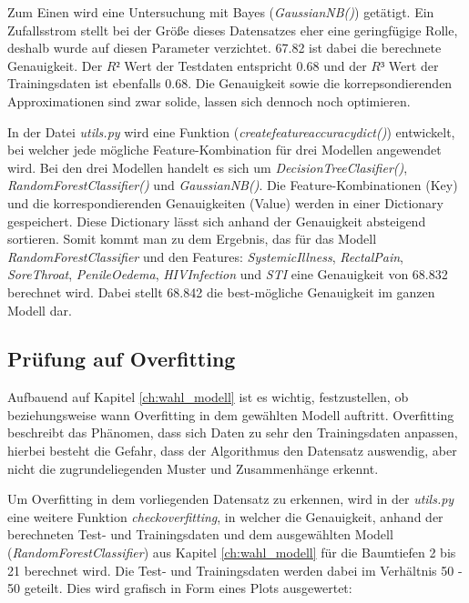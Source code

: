 \documentclass[13pt,a4paper, listof=entryprefix, bibliography=totocnumbered,toc=listofnumbered,lof=listofnumbered]{scrartcl}
\begin{document}
Zum Einen wird eine Untersuchung mit Bayes (\textit{GaussianNB()}) getätigt. Ein Zufallsstrom stellt bei der Größe dieses Datensatzes eher eine geringfügige
Rolle, deshalb wurde auf diesen Parameter verzichtet. 67.82 ist dabei die berechnete Genauigkeit. Der $R²$ Wert der Testdaten entspricht 0.68 und der $R³$ Wert der
Trainingsdaten ist ebenfalls 0.68.  Die Genauigkeit sowie die korrepsondierenden Approximationen sind zwar solide, lassen sich dennoch noch optimieren. 

In der Datei \textit{utils.py} wird eine Funktion (\textit{create\textunderscore feature\textunderscore accuracy\textunderscore dict()}) entwickelt, bei welcher jede mögliche Feature-Kombination für drei Modellen angewendet wird. Bei den drei Modellen handelt es sich um 
\textit{DecisionTreeClasifier()}, \textit{RandomForestClassifier()} und \textit{GaussianNB()}. Die Feature-Kombinationen (Key) und die korrespondierenden Genauigkeiten (Value) werden in 
einer Dictionary gespeichert. Diese Dictionary lässt sich anhand der Genauigkeit absteigend sortieren. Somit kommt man zu dem Ergebnis, das für das Modell \textit{RandomForestClassifier} und 
den Features: \textit{Systemic\textunderscore  Illness}, \textit{Rectal\textunderscore Pain}, \textit{Sore\textunderscore Throat}, \textit{Penile\textunderscore Oedema}, \textit{HIV\textunderscore Infection} und \textit{STI} 
eine Genauigkeit von 68.832 berechnet wird. Dabei stellt 68.842 die best-mögliche Genauigkeit im ganzen Modell dar. 

	\subsection{Prüfung auf Overfitting}
		\label{ch:pruefung_overfitting}

Aufbauend auf Kapitel \ref{ch:wahl_modell} ist es wichtig, festzustellen, ob beziehungsweise wann Overfitting in dem gewählten Modell auftritt. Overfitting beschreibt das Phänomen, dass
sich Daten zu sehr den Trainingsdaten anpassen, hierbei besteht die Gefahr, dass der Algorithmus den Datensatz auswendig, aber nicht die zugrundeliegenden Muster und Zusammenhänge erkennt.

Um Overfitting in dem vorliegenden Datensatz zu erkennen, wird in der \textit{utils.py} eine weitere Funktion \textit{check\textunderscore over\textunderscore fitting}, in welcher
die Genauigkeit, anhand der berechneten Test- und Trainingsdaten und dem ausgewählten Modell (\textit{RandomForestClassifier}) aus 
Kapitel \ref{ch:wahl_modell} für die Baumtiefen 2 bis 21 berechnet wird. Die Test- und Trainingsdaten werden dabei im Verhältnis 50 - 50 geteilt. 
Dies wird grafisch in Form eines Plots ausgewertet: 
\end{document}
